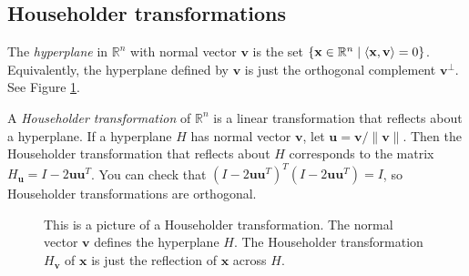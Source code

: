 \subsection*{Householder transformations}
The \emph{hyperplane} in $\mathbb{R}^n$ with normal vector $\mathbf{v}$ is the set $\{ {\bf x} \in \mathbb{R}^n \mid \langle {\bf x}, \mathbf{v} \rangle = 0 \}$. 
Equivalently, the hyperplane defined by $\mathbf{v}$ is just the orthogonal complement $\mathbf{v}^{\perp}$. 
See Figure \ref{fig:Householder_reflector}.

A \emph{Householder transformation} of $\mathbb{R}^n$ is a linear transformation that reflects about a hyperplane. 
If a hyperplane $H$ has normal vector $\mathbf{v}$, let $\mathbf{u} = \mathbf{v}/\|\mathbf{v}\|$. 
Then the Householder transformation that reflects about $H$ corresponds to the matrix $H_{\mathbf{u}} = I - 2 \mathbf{u}\mathbf{u}^T$. 
You can check that $(I - 2 \mathbf{u}\mathbf{u}^T)^T(I - 2 \mathbf{u}\mathbf{u}^T)=I$, so Householder transformations are orthogonal.

\begin{figure}
\begin{center}
\end{center}
\caption{This is a picture of a Householder transformation. 
The normal vector $\mathbf{v}$ defines the hyperplane $H$. 
The Householder transformation $H_{\mathbf{v}}$ of $\mathbf{x}$ is just the reflection of $\mathbf{x}$ across $H$.}
\label{fig:Householder_reflector}
\end{figure}

